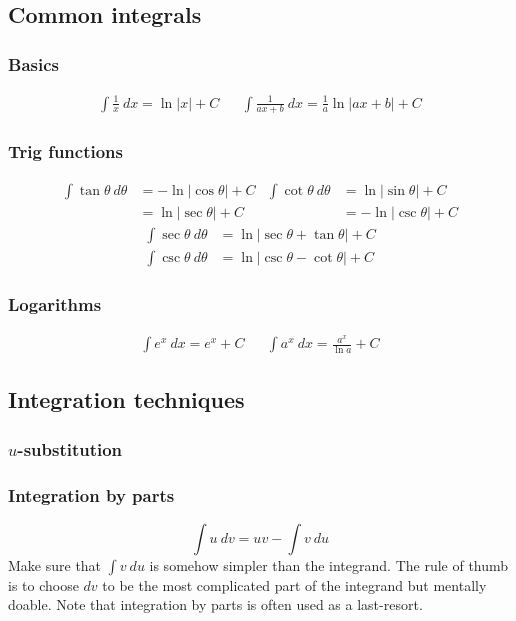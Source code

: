 \documentclass[main.tex]{subfiles}
\begin{document}
	\subsection*{Common integrals}
	\subsubsection*{Basics}
	\begin{align*}
	\int \frac{1}{x} \ dx = \ln |x| + C && \int \frac{1}{ax + b} \ dx = \frac{1}{a} \ln |ax + b| + C
	\end{align*}

	\subsubsection*{Trig functions}
	\begin{align*}
		\int \tan{\theta} \ d\theta &= -\ln{|\cos{\theta}|} + C & \int \cot{\theta} \ d\theta &= \ln{|\sin{\theta}|} + C \\
		&= \ln{|\sec{\theta}|} + C & &= -\ln{|\csc{\theta}|} + C
	\end{align*}
	\begin{align*}
		\int \sec{\theta} \ d\theta &= \ln{|\sec{\theta} + \tan{\theta}|} + C \\
		\int \csc{\theta} \ d\theta &= \ln{|\csc{\theta} - \cot{\theta}|} + C
	\end{align*}
	\subsubsection*{Logarithms}
	\begin{align*}
	\int e^x \ dx = e^x + C && \int a^x \ dx = \frac{a^x}{\ln{a}} + C
	\end{align*}

	\subsection*{Integration techniques}
	\subsubsection*{\(u\)-substitution}

	\subsubsection*{Integration by parts}
	\[\int u \ dv = uv - \int v \ du\]
	Make sure that \(\int v \ du\) is somehow simpler than the integrand. The rule of thumb is to choose \(dv\) to be the most complicated part of the integrand but mentally doable. Note that integration by parts is often used as a last-resort.
\end{document}
